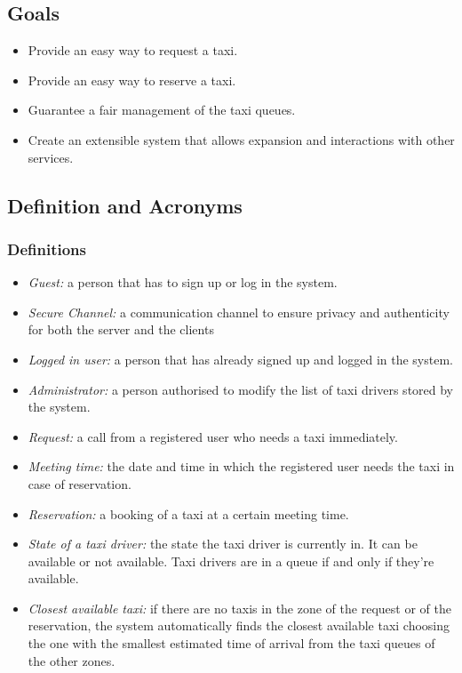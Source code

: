 \documentclass{article}
\begin{document}
\subsection{Goals}
\begin{itemize}
	\item Provide an easy way to request a taxi.
	\item Provide an easy way to reserve a taxi.
	\item Guarantee a fair management of the taxi queues.
	\item Create an extensible system that allows expansion and interactions with other services.
\end{itemize}

\subsection{Definition and Acronyms}

\subsubsection{Definitions}
\begin{itemize}
	\item \textit{Guest:} a person that has to sign up or log in the system.
	\item \textit{Secure Channel:} a communication channel to ensure privacy and authenticity for both the server and the clients 
	\item \textit{Logged in user:} a person that has already signed up and logged in the system.
	\item \textit{Administrator:} a person authorised to modify the list of taxi drivers stored by the system.
	\item \textit{Request:} a call from a registered user who needs a taxi immediately.
	\item \textit{Meeting time:} the date and time in which the registered user needs the taxi in case of reservation. 
	\item \textit{Reservation:} a booking of a taxi at a certain meeting time.
	\item \textit{State of a taxi driver:} the state the taxi driver is currently in. It can be available or not available. Taxi drivers are in a queue if and only if they're available.
	\item \textit{Closest available taxi:} if there are no taxis in the zone of the request or of the reservation, the system automatically finds the closest available taxi choosing the one with the smallest estimated time of arrival from the taxi queues of the other zones.
\end{itemize}
\end{document}
